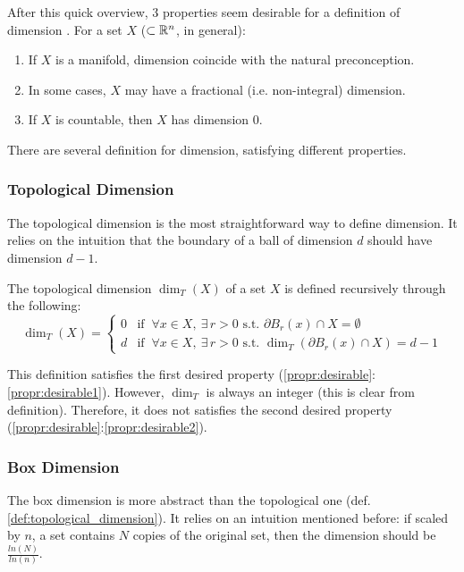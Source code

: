 After this quick overview, 3 properties seem desirable for a definition of dimension \cite{Pollicott_LFDT}.
For a set $X$ ($\subset \mathbb{R}^n$, in general):
\begin{enumerate}\label{propr:desirable}
	\item If $X$ is a manifold, dimension coincide with the natural preconception. \label{propr:desirable1}
	\item In some cases, $X$ may have a fractional (i.e. non-integral) dimension. \label{propr:desirable2}
	\item If $X$ is countable, then $X$ has dimension $0$. \label{propr:desirable3}
\end{enumerate}
There are several definition for dimension, satisfying different properties.

\subsubsection{Topological Dimension}
The topological dimension is the most straightforward way to define dimension.
It relies on the intuition that the boundary of a ball of dimension $d$ should have dimension $d-1$.

\begin{definition}\label{def:topological_dimension}
	The topological dimension $\dim_T(X)$ of a set $X$ is defined recursively through the following:
	\begin{equation*}
		\dim_T(X) =
		\begin{cases}
			0 & \text{if } \ \forall x \in X, \ \exists \, r>0 \text{ s.t. } \partial B_r(x) \cap X = \emptyset\\
			d & \text{if } \ \forall x \in X, \ \exists \, r>0 \text{ s.t. } \dim_T(\partial B_r(x) \cap X) = d-1
		\end{cases}
	\end{equation*}
\end{definition}

This definition satisfies the first desired property (\ref{propr:desirable}:\ref{propr:desirable1}).
However, $\dim_T$ is always an integer (this is clear from definition).
Therefore, it does not satisfies the second desired property (\ref{propr:desirable}:\ref{propr:desirable2}).

\subsubsection{Box Dimension}
The box dimension is more abstract than the topological one (def. \ref{def:topological_dimension}).
It relies on an intuition mentioned before: if scaled by $n$, a set contains $N$ copies of the original set, then the dimension should be  $\frac{ln(N)}{ln(n)}$.

